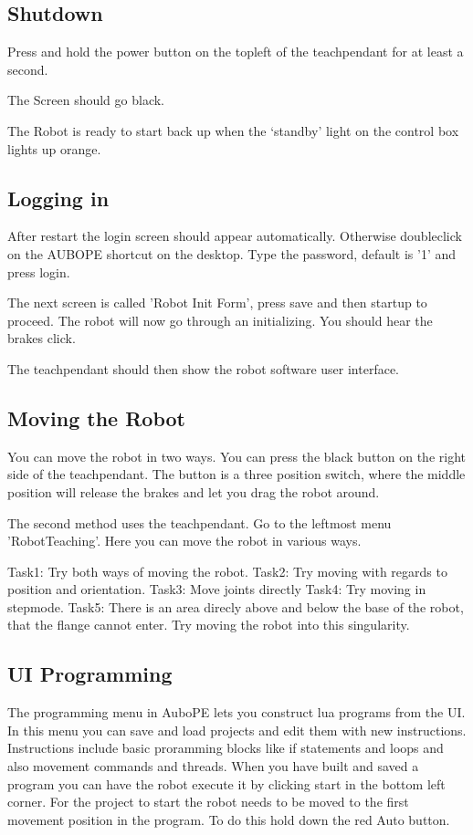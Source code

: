 \documentclass{article}
\begin{document}
\subsection{Shutdown} 
Press and hold the power button on the topleft of the teachpendant for at least a second.

The Screen should go black. 

The Robot is ready to start back up when the ‘standby’ light on the control box lights up orange. 

\subsection{Logging in}
\label{subsec:login}
After restart the login screen should appear automatically. Otherwise doubleclick on the AUBOPE shortcut on the desktop. Type the password, default is '1' and press login. 

The next screen is called 'Robot Init Form', press save and then startup to proceed. The robot will now go through an initializing. You should hear the brakes click.

The teachpendant should then show the robot software user interface.  


\subsection{Moving the Robot}
You can move the robot in two ways. 
You can press the black button on the right side of the teachpendant. The button is a three position switch, where the middle position will release the brakes and let you drag the robot around.

The second method uses the teachpendant. Go to the leftmost menu 'RobotTeaching'. Here you can move the robot in various ways.

Task1: Try both ways of moving the robot. 
Task2: Try moving with regards to position and orientation. 
Task3: Move joints directly
Task4: Try moving in stepmode. 
Task5: There is an area direcly above and below the base of the robot, that the flange cannot enter. Try moving the robot into this singularity. 
  
\subsection{UI Programming} 

The programming menu in AuboPE lets you construct lua programs from the UI. In this menu you can save and load projects and edit them with new instructions. Instructions include basic proramming blocks like if statements and loops and also movement commands and threads. 
When you have built and saved a program you can have the robot execute it by clicking start in the bottom left corner. For the project to start the robot needs to be moved to the first movement position in the program. To do this hold down the red Auto button. 
\end{document}
